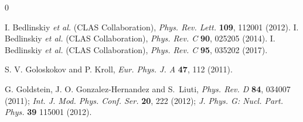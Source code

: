 \documentclass[prc,floatfix,superscriptaddress]{revtex4}
\begin{document}

\begin{thebibliography} {0}

 I. Bedlinskiy {\it et al.} (CLAS Collaboration), \emph{ Phys. Rev. Lett. }{\bf 109}, 112001 (2012). 
 I. Bedlinskiy {\it et al.} (CLAS Collaboration), \emph{ Phys. Rev. C} {\bf 90}, 025205 (2014).
 I. Bedlinskiy {\it et al.} (CLAS Collaboration), \emph{ Phys. Rev. C} {\bf 95}, 035202 (2017).




 S. V. Goloskokov and P. Kroll, \emph{ Eur. Phys. J. A} {\bf47}, 112 (2011).

  G. Goldstein, J. O. Gonzalez-Hernandez  and S.~Liuti,%
\emph{ Phys. Rev. D }{\bf84}, 034007 (2011);
\emph{ Int. J. Mod. Phys. Conf. Ser. }{\bf20}, 222 (2012);
\emph{ J. Phys. G: Nucl. Part. Phys.} {\bf39} 115001 (2012).









\end{thebibliography}
\end{document}
